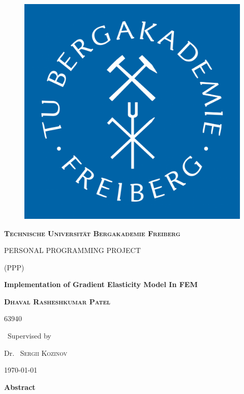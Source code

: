 \documentclass[12pt]{article}
\begin{document}
	\begin{titlepage}
		\centering
		
		\begin{figure}
			\begin{center}
				\includegraphics[scale=.2]{tubaf.pdf}  
			\end{center}
			
		\end{figure}
		
		
		
		{\scshape\LARGE \textbf{Technische Universit\"at Bergakademie Freiberg} \par}
		\vspace{1cm}
		{\scshape\Large PERSONAL PROGRAMMING PROJECT\par}
		{\scshape\Large (PPP)\par}
		\vspace{1.5cm}
		{\huge\bfseries Implementation of Gradient Elasticity Model In FEM \par}
		\vspace{2cm}
		{\scshape\Large \textbf{Dhaval Rasheshkumar Patel}\par}
		{\scshape\Large 63940\par}
		\vfill
		{\normalsize\ Supervised by\par}
		
		Dr.~ \textsc{Sergii Kozinov}
		
		\vfill
		
		{\large \today\par}
	\end{titlepage}
	\clearpage
    \textbf{\LARGE Abstract}\\ \newline
    \newline
\end{document}
